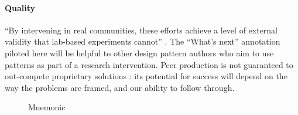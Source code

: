 \begin{refsection}
\paragraph{Quality} 
``By intervening in real communities, these efforts achieve a level of
external validity that lab-based experiments cannot''
\cite{benkler2015peer}.  The ``What's next'' annotation piloted here
will be helpful to other design pattern authors who aim to use
patterns as part of a research intervention.  Peer production is not guaranteed to
  out-compete proprietary solutions
\cite{benkler2015peer,free-software-better}: its potential for
success will depend on the way the problems are framed,
and our ability to follow through.


\printbibliography[heading=subbibliography]

\begin{figure}
{\centering


\par}
\vspace{-.5cm}
\caption{Mnemonic \label{mnemonic}}
\end{figure}

\end{refsection}
